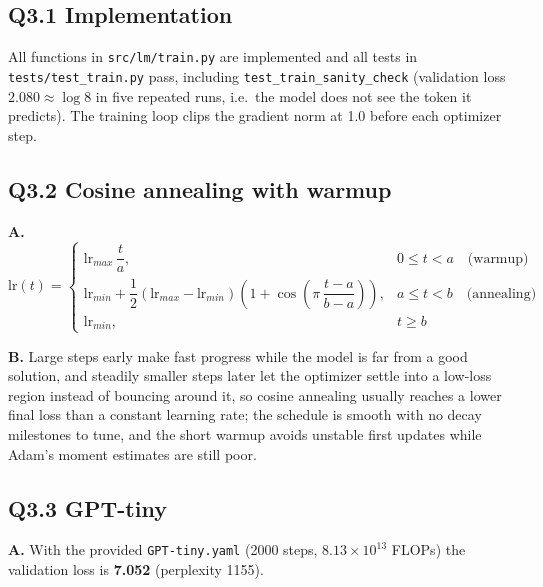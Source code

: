 \documentclass[11pt]{article}
\begin{document}
\subsection*{Q3.1 Implementation}
All functions in \texttt{src/lm/train.py} are implemented and all tests in \texttt{tests/test\_train.py} pass, including \texttt{test\_train\_sanity\_check} (validation loss $2.080 \approx \log 8$ in five repeated runs, i.e.\ the model does not see the token it predicts). The training loop clips the gradient norm at 1.0 before each optimizer step.

\subsection*{Q3.2 Cosine annealing with warmup}
\textbf{A.}
\[
\text{lr}(t) =
\begin{cases}
\text{lr}_{max}\,\dfrac{t}{a}, & 0 \le t < a \quad \text{(warmup)}\\[2ex]
\text{lr}_{min} + \dfrac{1}{2}\left(\text{lr}_{max} - \text{lr}_{min}\right)\left(1 + \cos\!\left(\pi\,\dfrac{t-a}{b-a}\right)\right), & a \le t < b \quad \text{(annealing)}\\[2ex]
\text{lr}_{min}, & t \ge b
\end{cases}
\]

\textbf{B.} Large steps early make fast progress while the model is far from a good solution, and steadily smaller steps later let the optimizer settle into a low-loss region instead of bouncing around it, so cosine annealing usually reaches a lower final loss than a constant learning rate; the schedule is smooth with no decay milestones to tune, and the short warmup avoids unstable first updates while Adam's moment estimates are still poor.

\subsection*{Q3.3 GPT-tiny}
\textbf{A.} With the provided \texttt{GPT-tiny.yaml} (2000 steps, $8.13\times10^{13}$ FLOPs) the validation loss is \textbf{7.052} (perplexity 1155).
\end{document}
